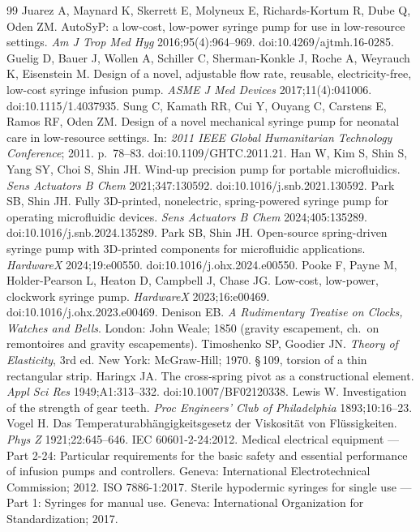 \documentclass[11pt,a4paper]{article}
\begin{document}
\begin{thebibliography}{99}
 Juarez A, Maynard K, Skerrett E, Molyneux E, Richards-Kortum R, Dube Q, Oden ZM. AutoSyP: a low-cost, low-power syringe pump for use in low-resource settings. \emph{Am J Trop Med Hyg} 2016;95(4):964--969. doi:10.4269/ajtmh.16-0285.
 Guelig D, Bauer J, Wollen A, Schiller C, Sherman-Konkle J, Roche A, Weyrauch K, Eisenstein M. Design of a novel, adjustable flow rate, reusable, electricity-free, low-cost syringe infusion pump. \emph{ASME J Med Devices} 2017;11(4):041006. doi:10.1115/1.4037935.
 Sung C, Kamath RR, Cui Y, Ouyang C, Carstens E, Ramos RF, Oden ZM. Design of a novel mechanical syringe pump for neonatal care in low-resource settings. In: \emph{2011 IEEE Global Humanitarian Technology Conference}; 2011. p.~78--83. doi:10.1109/GHTC.2011.21.
 Han W, Kim S, Shin S, Yang SY, Choi S, Shin JH. Wind-up precision pump for portable microfluidics. \emph{Sens Actuators B Chem} 2021;347:130592. doi:10.1016/j.snb.2021.130592.
 Park SB, Shin JH. Fully 3D-printed, nonelectric, spring-powered syringe pump for operating microfluidic devices. \emph{Sens Actuators B Chem} 2024;405:135289. doi:10.1016/j.snb.2024.135289.
 Park SB, Shin JH. Open-source spring-driven syringe pump with 3D-printed components for microfluidic applications. \emph{HardwareX} 2024;19:e00550. doi:10.1016/j.ohx.2024.e00550.
 Pooke F, Payne M, Holder-Pearson L, Heaton D, Campbell J, Chase JG. Low-cost, low-power, clockwork syringe pump. \emph{HardwareX} 2023;16:e00469. doi:10.1016/j.ohx.2023.e00469.
 Denison EB. \emph{A Rudimentary Treatise on Clocks, Watches and Bells}. London: John Weale; 1850 (gravity escapement, ch.~on remontoires and gravity escapements).
 Timoshenko SP, Goodier JN. \emph{Theory of Elasticity}, 3rd ed. New York: McGraw-Hill; 1970. \S\,109, torsion of a thin rectangular strip.
 Haringx JA. The cross-spring pivot as a constructional element. \emph{Appl Sci Res} 1949;A1:313--332. doi:10.1007/BF02120338.
 Lewis W. Investigation of the strength of gear teeth. \emph{Proc Engineers' Club of Philadelphia} 1893;10:16--23.
 Vogel H. Das Temperaturabh\"angigkeitsgesetz der Viskosit\"at von Fl\"ussigkeiten. \emph{Phys Z} 1921;22:645--646.
 IEC 60601-2-24:2012. Medical electrical equipment --- Part 2-24: Particular requirements for the basic safety and essential performance of infusion pumps and controllers. Geneva: International Electrotechnical Commission; 2012.
 ISO 7886-1:2017. Sterile hypodermic syringes for single use --- Part 1: Syringes for manual use. Geneva: International Organization for Standardization; 2017.
\end{thebibliography}
\end{document}
